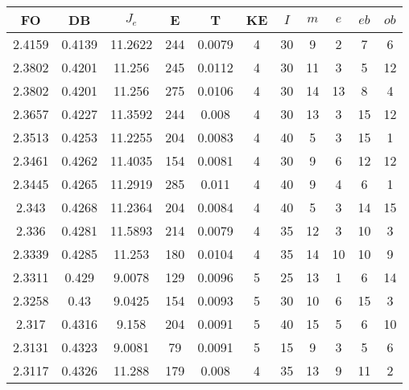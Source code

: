 \begin{table}[h!]
    \footnotesize
    \begin{center}
        \begin{tabular}{|c|c|c|c|c|c|c|c|c|c|c|}
        \hline
            {\bf FO} & {\bf DB} & $J_e$ & {\bf E} & {\bf T} & {\bf KE} & $I$ & $m$ & $e$ & $eb$ & $ob$ \\
        \hline
        \hline
            2.4159 & 0.4139  & 11.2622 & 244 & 0.0079 & 4 & 30 & 9 & 2 & 7 & 6\\
        \hline
        \hline
            2.3802 & 0.4201  & 11.256 & 245 & 0.0112 & 4 & 30 & 11 & 3 & 5 & 12\\
        \hline
        \hline
            2.3802 & 0.4201  & 11.256 & 275 & 0.0106 & 4 & 30 & 14 & 13 & 8 & 4\\
        \hline
        \hline
            2.3657 & 0.4227  & 11.3592 & 244 & 0.008 & 4 & 30 & 13 & 3 & 15 & 12\\
        \hline
        \hline
            2.3513 & 0.4253  & 11.2255 & 204 & 0.0083 & 4 & 40 & 5 & 3 & 15 & 1\\
        \hline
        \hline
            2.3461 & 0.4262  & 11.4035 & 154 & 0.0081 & 4 & 30 & 9 & 6 & 12 & 12\\
        \hline
        \hline
            2.3445 & 0.4265  & 11.2919 & 285 & 0.011 & 4 & 40 & 9 & 4 & 6 & 1\\
        \hline
        \hline
            2.343 & 0.4268  & 11.2364 & 204 & 0.0084 & 4 & 40 & 5 & 3 & 14 & 15\\
        \hline
        \hline
            2.336 & 0.4281  & 11.5893 & 214 & 0.0079 & 4 & 35 & 12 & 3 & 10 & 3\\
        \hline
        \hline
            2.3339 & 0.4285  & 11.253 & 180 & 0.0104 & 4 & 35 & 14 & 10 & 10 & 9\\
        \hline
        \hline
            2.3311 & 0.429  & 9.0078 & 129 & 0.0096 & 5 & 25 & 13 & 1 & 6 & 14\\
        \hline
        \hline
            2.3258 & 0.43  & 9.0425 & 154 & 0.0093 & 5 & 30 & 10 & 6 & 15 & 3\\
        \hline
        \hline
            2.317 & 0.4316  & 9.158 & 204 & 0.0091 & 5 & 40 & 15 & 5 & 6 & 10\\
        \hline
        \hline
            2.3131 & 0.4323  & 9.0081 & 79 & 0.0091 & 5 & 15 & 9 & 3 & 5 & 6\\
        \hline
        \hline
            2.3117 & 0.4326  & 11.288 & 179 & 0.008 & 4 & 35 & 13 & 9 & 11 & 2\\

\end{tabular}
\end{center}
\end{table}
